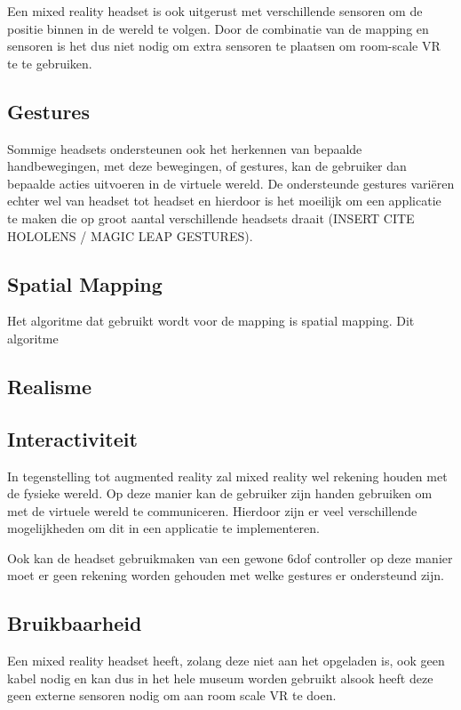 Een mixed reality headset is ook uitgerust met verschillende sensoren om de positie binnen in de wereld te volgen. Door de combinatie van de mapping en sensoren is het dus niet nodig om extra sensoren te plaatsen om room-scale VR te te gebruiken.

\subsection{Gestures}
Sommige headsets ondersteunen ook het herkennen van bepaalde handbewegingen, met deze bewegingen, of gestures, kan de gebruiker dan bepaalde acties uitvoeren in de virtuele wereld. De ondersteunde gestures variëren echter wel van headset tot headset en hierdoor is het moeilijk om een applicatie te maken die op groot aantal verschillende headsets draait (INSERT CITE HOLOLENS / MAGIC LEAP GESTURES).


\subsection{Spatial Mapping}
Het algoritme dat gebruikt wordt voor de mapping is spatial mapping. Dit algoritme %

\subsection{Realisme}


\subsection{Interactiviteit}
In tegenstelling tot augmented reality zal mixed reality wel rekening houden met de fysieke wereld. Op deze manier kan de gebruiker zijn handen gebruiken om met de virtuele wereld te communiceren. Hierdoor zijn er veel verschillende mogelijkheden om dit in een applicatie te implementeren.

Ook kan de headset gebruikmaken van een gewone \acrshort{6dof} controller op deze manier moet er geen rekening worden gehouden met welke gestures er ondersteund zijn.

\subsection{Bruikbaarheid}
Een mixed reality headset heeft, zolang deze niet aan het opgeladen is, ook geen kabel nodig en kan dus in het hele museum worden gebruikt alsook heeft deze geen externe sensoren nodig om aan room scale VR te doen. 


